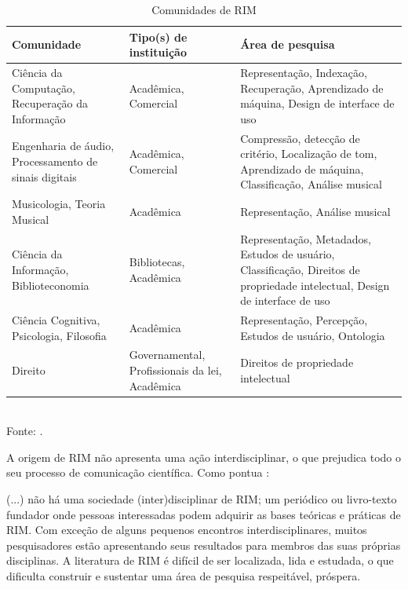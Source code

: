 \begin{table}[h]
    \centering
    \caption{Comunidades de RIM}
    \begin{tabular}{|p{4cm}|p{4cm}|p{4cm}|}
    \hline
        Comunidade & Tipo(s) de instituição & Área de pesquisa \\
    \hline
        Ciência da Computação, Recuperação da Informação & Acadêmica, Comercial & Representação, Indexação, Recuperação, Aprendizado de máquina, Design de interface de uso \\
    \hline
        Engenharia de áudio, Processamento de sinais digitais & Acadêmica, Comercial & Compressão, detecção de critério, Localização de tom, Aprendizado de máquina, Classificação, Análise musical \\
    \hline
        Musicologia, Teoria Musical & Acadêmica & Representação, Análise musical \\
    \hline
        Ciência da Informação, Biblioteconomia & Bibliotecas, Acadêmica & Representação, Metadados, Estudos de usuário, Classificação, Direitos de propriedade intelectual, Design de interface de uso \\
    \hline
        Ciência Cognitiva, Psicologia, Filosofia & Acadêmica & Representação, Percepção, Estudos de usuário, Ontologia \\
    \hline
        Direito & Governamental, Profissionais da lei, Acadêmica & Direitos de propriedade intelectual \\
    \hline
    \end{tabular}
    \label{tab:comunidadeRim}
    \\Fonte: \cite{futrelle&downie2002}.
\end{table}

A origem de RIM não apresenta uma ação interdisciplinar, o que prejudica todo o seu processo de comunicação científica. Como  pontua :

\begin{citacao}
(...) não há uma sociedade (inter)disciplinar de RIM; um periódico ou livro-texto fundador onde pessoas interessadas podem adquirir as bases teóricas e práticas de RIM. Com exceção de alguns pequenos encontros interdisciplinares, muitos pesquisadores estão apresentando seus resultados para membros das suas próprias disciplinas. A literatura de RIM é difícil de ser localizada, lida e estudada, o que dificulta construir e sustentar uma área de pesquisa respeitável, próspera.
\end{citacao}

